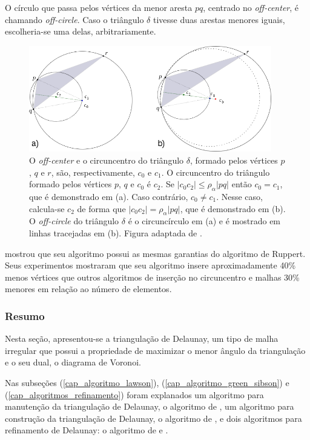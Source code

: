 O círculo que passa pelos vértices da menor aresta $pq$, centrado no {\it off-center}, é chamando {\it off-circle}. Caso o triângulo $\delta$ tivesse duas arestas menores iguais, escolheria-se uma delas, arbitrariamente. 

\begin{figure}[!ht]
  \centering
  \includegraphics[width=300pt]{imagens_delaunay/off-center_A_B_rotulado.png}
  \caption{\footnotesize{ O {\it off-center} e o circuncentro do triângulo $\delta$, formado pelos vértices $p$, $q$ e $r$, são, respectivamente, $c_{0}$ e $c_{1}$. O circuncentro do triângulo formado pelos vértices $p$, $q$ e $c_{0}$ é $c_2$. Se $|c_{0} c_{2}| \leq \rho_{\alpha}|pq|$ então $c_{0} = c_{1}$, que é demonstrado em (a). Caso contrário, $c_{0} \neq c_{1}$. Nesse caso, calcula-se $c_{2}$ de forma que $|c_{0} c_{2}| = \rho_{\alpha}|pq|$, que é demonstrado em (b). O {\it off-circle} do triângulo $\delta$ é o circuncírculo em (a) e é mostrado em linhas tracejadas em (b). Figura adaptada de .
}}
  \label{fig_off_center}
\end{figure}

 mostrou que seu algoritmo possui as mesmas garantias do algoritmo de Ruppert. Seus experimentos mostraram que seu algoritmo insere aproximadamente 40\% menos vértices que outros algoritmos de inserção no circuncentro e malhas 30\% menores em relação ao número de elementos.

\subsubsection{Resumo}

Nesta seção, apresentou-se a triangulação de Delaunay, um tipo de malha irregular que possui a propriedade de maximizar o menor ângulo da triangulação e o seu dual, o diagrama de Voronoi. 

Nas subseções (\ref{cap_algoritmo_lawson}), (\ref{cap_algoritmo_green_sibson}) e (\ref{cap_algoritmos_refinamento}) foram explanados um algoritmo para manutenção da triangulação de Delaunay, o algoritmo de , um algoritmo para construção da triangulação de Delaunay, o algoritmo de , e dois algoritmos para refinamento de Delaunay: o algoritmo de  e .